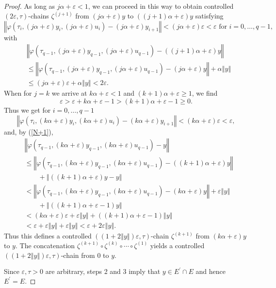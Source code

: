 \documentclass{siamltex}%
\begin{document}
\begin{proof}
As long as $j\alpha+\varepsilon<1$, we can proceed in this way to obtain
controlled $(2\varepsilon,\tau)$-chains $\zeta^{(j+1)}$ from $(j\alpha
+\varepsilon)y$ to $((j+1)\alpha+\varepsilon)y$ satisfying%
\[
\left\Vert \varphi(\tau_{i},(j\alpha+\varepsilon)y_{i},(j\alpha+\varepsilon
)u_{i})-(j\alpha+\varepsilon)y_{i+1}\right\Vert <(j\alpha+\varepsilon
)\varepsilon<\varepsilon\text{ for }i=0,\ldots,q-1,
\]
with%
\begin{align*}
&  \left\Vert \varphi(\tau_{q-1},(j\alpha+\varepsilon)y_{q-1},(j\alpha
+\varepsilon)u_{q-1})-((j+1)\alpha+\varepsilon)y\right\Vert \\
&  \leq\left\Vert \varphi(\tau_{q-1},(j\alpha+\varepsilon)y_{q-1}%
,(j\alpha+\varepsilon)u_{q-1})-(j\alpha+\varepsilon)y\right\Vert
+\alpha\left\Vert y\right\Vert \\
&  \leq(j\alpha+\varepsilon)\varepsilon+\alpha\left\Vert y\right\Vert
<2\varepsilon.
\end{align*}
When for $j=k$ we arrive at $k\alpha+\varepsilon<1$ and $(k+1)\alpha
+\varepsilon\geq1$, we find%
\begin{equation}
\varepsilon>\varepsilon+k\alpha+\varepsilon-1>(k+1)\alpha+\varepsilon-1\geq0.
\label{N+1}%
\end{equation}
Thus we get for $i=0,\ldots,q-1$%
\[
\left\Vert \varphi(\tau_{i},(k\alpha+\varepsilon)y_{i},(k\alpha+\varepsilon
)u_{i})-(k\alpha+\varepsilon)y_{i+1}\right\Vert <(k\alpha+\varepsilon
)\varepsilon<\varepsilon,
\]
and, by (\ref{N+1}),%
\begin{align*}
&  \left\Vert \varphi(\tau_{q-1},(k\alpha+\varepsilon)y_{q-1},(k\alpha
+\varepsilon)u_{q-1})-y\right\Vert \\
&  \leq\left\Vert \varphi(\tau_{q-1},(k\alpha+\varepsilon)y_{q-1}%
,(k\alpha+\varepsilon)u_{q-1})-((k+1)\alpha+\varepsilon)y\right\Vert \\
&  \qquad+\left\Vert ((k+1)\alpha+\varepsilon)y-y\right\Vert \\
&  <\left\Vert \varphi(\tau_{q-1},(k\alpha+\varepsilon)y_{q-1},(k\alpha
+\varepsilon)u_{q-1})-(k\alpha+\varepsilon)y\right\Vert +\varepsilon\left\Vert
y\right\Vert \\
&  \qquad+\left\Vert ((k+1)\alpha+\varepsilon-1)y\right\Vert \\
&  <(k\alpha+\varepsilon)\varepsilon+\varepsilon\left\Vert y\right\Vert
+((k+1)\alpha+\varepsilon-1)\left\Vert y\right\Vert \\
&  <\varepsilon+\varepsilon\left\Vert y\right\Vert +\varepsilon\left\Vert
y\right\Vert <\varepsilon+2\varepsilon\left\Vert y\right\Vert .
\end{align*}
Thus this defines a controlled $((1+2\left\Vert y\right\Vert )\varepsilon
,\tau)$-chain $\zeta^{(k+1)}$ from $(k\alpha+\varepsilon)y$ to $y$. The
concatenation $\zeta^{(k+1)}\circ\zeta^{(k)}\circ\cdots\circ\zeta^{(1)}$
yields a controlled $((1+2\left\Vert y\right\Vert )\varepsilon,\tau)$-chain
from $0$ to $y$.

Since $\varepsilon,\tau>0$ are arbitrary, steps 2 and 3 imply that $y\in
E^{\prime}\cap E$ and hence $E^{\prime}=E$.
\end{proof}
\end{document}
